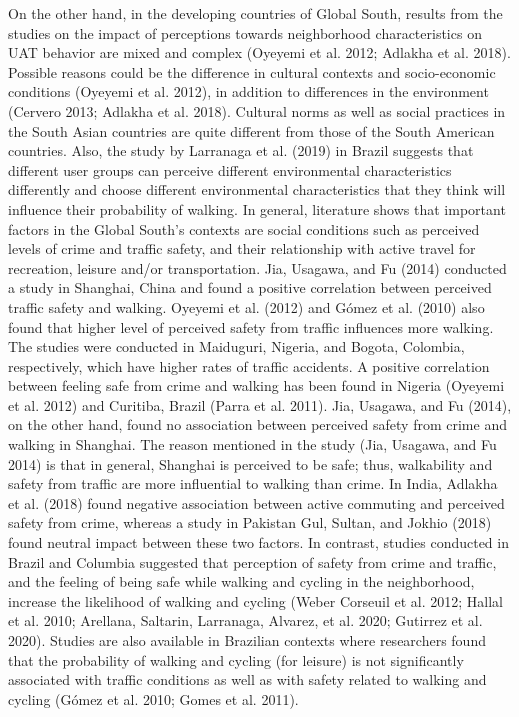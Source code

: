 \documentclass[]{elsarticle} %
\begin{document}
On the other hand, in the developing countries of Global South, results
from the studies on the impact of perceptions towards neighborhood
characteristics on UAT behavior are mixed and complex (Oyeyemi et al.
2012; Adlakha et al. 2018). Possible reasons could be the difference in
cultural contexts and socio-economic conditions (Oyeyemi et al. 2012),
in addition to differences in the environment (Cervero 2013; Adlakha et
al. 2018). Cultural norms as well as social practices in the South Asian
countries are quite different from those of the South American
countries. Also, the study by Larranaga et al. (2019) in Brazil suggests
that different user groups can perceive different environmental
characteristics differently and choose different environmental
characteristics that they think will influence their probability of
walking. In general, literature shows that important factors in the
Global South's contexts are social conditions such as perceived levels
of crime and traffic safety, and their relationship with active travel
for recreation, leisure and/or transportation. Jia, Usagawa, and Fu
(2014) conducted a study in Shanghai, China and found a positive
correlation between perceived traffic safety and walking. Oyeyemi et al.
(2012) and Gómez et al. (2010) also found that higher level of perceived
safety from traffic influences more walking. The studies were conducted
in Maiduguri, Nigeria, and Bogota, Colombia, respectively, which have
higher rates of traffic accidents. A positive correlation between
feeling safe from crime and walking has been found in Nigeria (Oyeyemi
et al. 2012) and Curitiba, Brazil (Parra et al. 2011). Jia, Usagawa, and
Fu (2014), on the other hand, found no association between perceived
safety from crime and walking in Shanghai. The reason mentioned in the
study (Jia, Usagawa, and Fu 2014) is that in general, Shanghai is
perceived to be safe; thus, walkability and safety from traffic are more
influential to walking than crime. In India, Adlakha et al. (2018) found
negative association between active commuting and perceived safety from
crime, whereas a study in Pakistan Gul, Sultan, and Jokhio (2018) found
neutral impact between these two factors. In contrast, studies conducted
in Brazil and Columbia suggested that perception of safety from crime
and traffic, and the feeling of being safe while walking and cycling in
the neighborhood, increase the likelihood of walking and cycling (Weber
Corseuil et al. 2012; Hallal et al. 2010; Arellana, Saltarin, Larranaga,
Alvarez, et al. 2020; Gutirrez et al. 2020). Studies are also available
in Brazilian contexts where researchers found that the probability of
walking and cycling (for leisure) is not significantly associated with
traffic conditions as well as with safety related to walking and cycling
(Gómez et al. 2010; Gomes et al. 2011).
\end{document}
